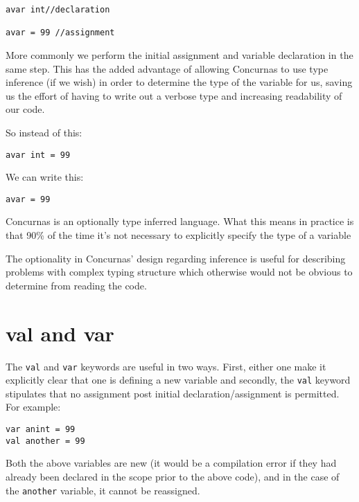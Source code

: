\documentclass[conc-doc]{subfiles}
\begin{document}
\begin{lstlisting}
avar int//declaration

avar = 99 //assignment
\end{lstlisting}

More commonly we perform the initial assignment and variable declaration in the same step. This has the added advantage of allowing Concurnas to use type inference (if we wish) in order to determine the type of the variable for us, saving us the effort of having to write out a verbose type and increasing readability of our code. 

So instead of this:
\begin{lstlisting}
avar int = 99
\end{lstlisting}

We can write this:

\begin{lstlisting}
avar = 99
\end{lstlisting}

Concurnas is an optionally type inferred language. What this means in practice is that 90\% of the time it’s not necessary to explicitly specify the type of a variable

The optionality in Concurnas’ design regarding inference is useful for describing problems with complex typing structure which otherwise would not be obvious to determine from reading the code.

\section{val and var}
The \lstinline{val} and \lstinline{var} keywords are useful in two ways. First, either one make it explicitly clear that one is defining a new variable and secondly, the \lstinline{val} keyword stipulates that no assignment post initial declaration/assignment is permitted. For example:

\begin{lstlisting}
var anint = 99
val another = 99
\end{lstlisting}

Both the above variables are new (it would be a compilation error if they had already been declared in the scope prior to the above code), and in the case of the \lstinline{another} variable, it cannot be reassigned.
\end{document}
